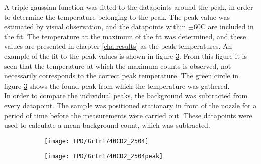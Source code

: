 A triple gaussian function was fitted to the datapoints around the peak, in order to determine the temperature belonging to the peak. The peak value was estimated by visual observation, and the datapoints within $\pm$60\degree C are included in the fit. The temperature at the maximum of the fit was determined, and these values are presented in chapter \ref{cha:results} as the peak temperatures. An example of the fit to the peak values is shown in figure \ref{TPD:peak}. From this figure it is seen that the temperature at which the maximum counts is observed, not necessarily corresponds to the correct peak temperature. The green circle in figure \ref{TPD:peak} shows the found peak from which the temperature was gathered.\\
In order to compare the individual peaks, the background was subtracted from every datapoint. The sample was positioned stationary in front of the nozzle for a period of time before the measurements were carried out. These datapoints were used to calculate a mean background count, which was subtracted.

\begin{figure}[H]
  \centering
  \begin{subfigure}[b]{0.45\textwidth}
    \texttt{[image: TPD/GrIr1740CD2\_2504]}
    \caption{}
    \label{TPD:example}
  \end{subfigure}
  \begin{subfigure}[b]{0.45\textwidth}
    \texttt{[image: TPD/GrIr1740CD2\_2504peak]}
    \caption{}
    \label{TPD:peak}
  \end{subfigure}
\end{figure}

